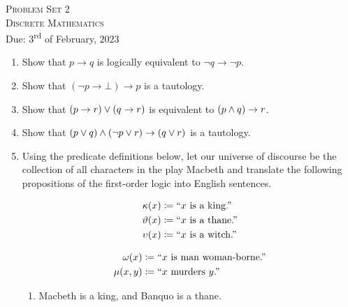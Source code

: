 




\begin{center}
    \textsc{\huge Problem Set 2}\\
    \textsc{\large Discrete Mathematics}\\
    {\color{gruvred}Due: $3$\textsuperscript{rd} of February, $2023$}
\end{center}

\begin{enumerate}
    \item
        Show that $p \rightarrow q$ is logically equivalent to $\neg q \rightarrow \neg p$.
    \item
        Show that $(\neg p \rightarrow \bot)  \rightarrow p$ is a tautology.
    \item
        Show that $(p \rightarrow r) \vee (q \rightarrow r)$ is equivalent to $(p \wedge q) \rightarrow r$.
    \item
        Show that $(p \vee q) \wedge (\neg p \vee r) \rightarrow (q \vee r)$ is a tautology.
    \item
        Using the predicate definitions below,
        let our universe of discourse be the collection of all characters in the play Macbeth
        and translate the following propositions of the first-order logic into English sentences.\\
        \begin{minipage}{.5\linewidth}
            \begin{align*}
                \kappa(x) &\coloneqq \text{``}x\text{ is a king.''}\\
                \vartheta(x) &\coloneqq \text{``}x\text{ is a thane.''}\\
                \upsilon(x) &\coloneqq \text{``}x\text{ is a witch.''}
            \end{align*}
        \end{minipage}%
        \begin{minipage}{.5\linewidth}
            \begin{align*}
                \omega(x) &\coloneqq \text{``}x\text{ is man woman-borne.''}\\
                \mu(x, y) &\coloneqq \text{``}x\text{ murders }y\text{.''}
            \end{align*}
        \end{minipage}
        \begin{enumerate}
            \item
                Macbeth is a king, and Banquo is a thane.

\end{enumerate}
\end{enumerate}
